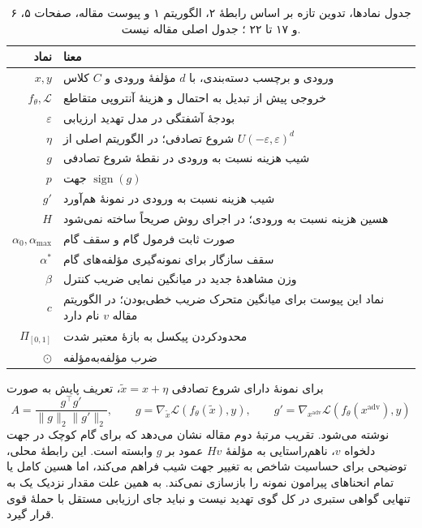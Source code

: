 \begin{table}[tbp]
\centering
\caption[نمادها و کمیت‌های روش]{جدول نمادها، تدوین تازه بر اساس رابطهٔ ۲، الگوریتم ۱ و پیوست  مقاله، صفحات ۵، ۶ و ۱۷ تا ۲۲ \cite{sora2026}؛ جدول اصلی مقاله نیست.}
\label{tab:app-symbols}
\small
\begin{tabular}{rp{10cm}}
\hline
نماد & معنا \\
\hline
$x,y$ & ورودی و برچسب دسته‌بندی، با $d$ مؤلفهٔ ورودی و $C$ کلاس \\
$f_\theta,\mathcal{L}$ & خروجی پیش از تبدیل به احتمال و هزینهٔ آنتروپی متقاطع \\
$\varepsilon$ & بودجهٔ آشفتگی در مدل تهدید ارزیابی \\
$\eta$ & شروع تصادفی؛ در الگوریتم اصلی از $U(-\varepsilon,\varepsilon)^d$ \\
$g$ & شیب هزینه نسبت به ورودی در نقطهٔ شروع تصادفی \\
$p$ & جهت $\operatorname{sign}(g)$ \\
$g'$ & شیب هزینه نسبت به ورودی در نمونهٔ هم‌آورد \\
$H$ & هسین هزینه نسبت به ورودی؛ در اجرای روش صریحاً ساخته نمی‌شود \\
$\alpha_0,\alpha_{\max}$ & صورت ثابت فرمول گام و سقف گام \\
$\alpha^*$ & سقف سازگار برای نمونه‌گیری مؤلفه‌های گام \\
$\beta$ & وزن مشاهدهٔ جدید در میانگین نمایی ضریب کنترل \\
$c$ & نماد این پیوست برای میانگین متحرک ضریب خطی‌بودن؛ در الگوریتم مقاله $v$ نام دارد \\
$\Pi_{[0,1]}$ & محدودکردن پیکسل به بازهٔ معتبر شدت \\
$\odot$ & ضرب مؤلفه‌به‌مؤلفه \\
\hline
\end{tabular}
\end{table}

برای نمونهٔ دارای شروع تصادفی $\widetilde{x}=x+\eta$، تعریف پایش به صورت
\begin{equation}
 A=\frac{g^\top g'}{\|g\|_2\|g'\|_2},\qquad
 g=\nabla_{\widetilde{x}}\mathcal{L}(f_\theta(\widetilde{x}),y),\qquad
 g'=\nabla_{x^{\mathrm{adv}}}\mathcal{L}(f_\theta(x^{\mathrm{adv}}),y)
 \label{eq:app-alignment}
\end{equation}
نوشته می‌شود. تقریب مرتبهٔ دوم مقاله نشان می‌دهد که برای گام کوچک در جهت دلخواه $v$، ناهم‌راستایی به مؤلفهٔ $Hv$ عمود بر $g$ وابسته است. این رابطهٔ محلی، توضیحی برای حساسیت شاخص به تغییر جهت شیب فراهم می‌کند، اما هسین کامل یا تمام انحناهای پیرامون نمونه را بازسازی نمی‌کند. به همین علت مقدار نزدیک یک به تنهایی گواهی ستبری در کل گوی تهدید نیست و نباید جای ارزیابی مستقل با حملهٔ قوی قرار گیرد.

